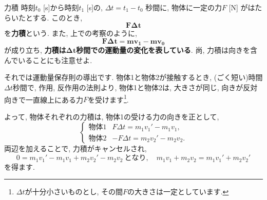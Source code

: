 \documentclass[11pt,dvipdfmx]{jsarticle}
\numberwithin{equation}{section} %
\begin{document}
\begin{freebox}{力積}
時刻$t_{0}$ [s]から時刻$t_{1}$ [s]の, $\Delta t = t_{1}-t_{0}$ 秒間に, 物体に一定の力$F$ [N] がはたらいたとする. このとき, 
\begin{equation}
    \bm{F\Delta t} \label{力積の式}
\end{equation}
を\textbf{力積}という. また, 上での考察のように, 
\begin{equation}
    \bm{F\Delta t} = \bm{mv_{1}} - \bm{mv_{0}}
\end{equation}
が成り立ち, \textbf{力積は$\bm{\Delta t}$秒間での運動量の変化を表している}. 尚, 力積は向きを含んでいることにも注意せよ.
\end{freebox}
それでは運動量保存則の導出です. 物体1と物体2が接触するとき, (ごく短い)時間$\Delta t$秒間で, 作用, 反作用の法則より, 物体1と物体2は, 大きさが同じ, 向きが反対向きで一直線上にある力$F$を受けます\footnote{$\Delta t$が十分小さいものとし, その間$F$の大きさは一定としています.}. 
\begin{center}
\end{center}
\vspace{-4mm}
よって, 物体それぞれの力積は, 物体1の受ける力の向きを正として, 
\begin{equation}
\begin{cases}
    \text{物体1} & F\Delta t = m_{1}v_{1}' - m_{1}v_{1},\\
    \text{物体2} & -F\Delta t = m_{2}v_{2}' - m_{2}v_{2}.
\end{cases}
\end{equation}
両辺を加えることで, 力積がキャンセルされ, 
\begin{equation}
    0 = m_{1}v_{1}' - m_{1}v_{1} + m_{2}v_{2}' - m_{2}v_{2} \ となり,\quad m_{1}v_{1} + m_{2}v_{2} = m_{1}v_{1}' + m_{2}v_{2}' 
\end{equation}
を得ます. 
\end{document}
